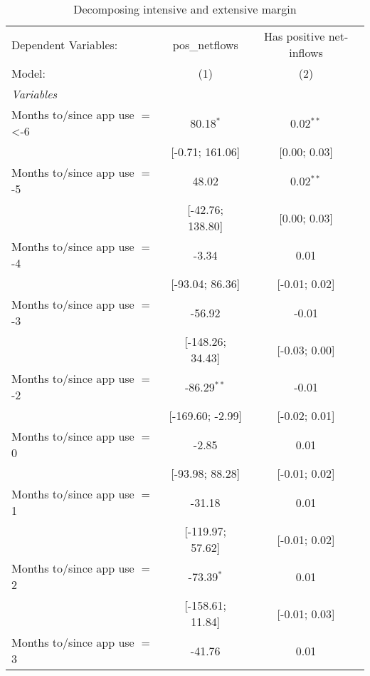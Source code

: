 
\begin{table}[htbp]
   \centering
   \tiny
   \begin{threeparttable}[b]
      \caption{\label{tab:reg_decomp_intext} Decomposing intensive and extensive margin}
      \begin{tabular}{lcc}
         \tabularnewline \midrule \midrule
         Dependent Variables:            & pos\_netflows    & Has positive net-inflows\\  
         Model:                          & (1)              & (2)\\  
         \midrule
         \emph{Variables}\\
         Months to/since app use $=$ <-6 & 80.18$^{*}$      & 0.02$^{**}$\\   
                                         & [-0.71; 161.06]  & [0.00; 0.03]\\   
         Months to/since app use $=$ -5  & 48.02            & 0.02$^{**}$\\   
                                         & [-42.76; 138.80] & [0.00; 0.03]\\   
         Months to/since app use $=$ -4  & -3.34            & 0.01\\   
                                         & [-93.04; 86.36]  & [-0.01; 0.02]\\   
         Months to/since app use $=$ -3  & -56.92           & -0.01\\   
                                         & [-148.26; 34.43] & [-0.03; 0.00]\\   
         Months to/since app use $=$ -2  & -86.29$^{**}$    & -0.01\\   
                                         & [-169.60; -2.99] & [-0.02; 0.01]\\   
         Months to/since app use $=$ 0   & -2.85            & 0.01\\   
                                         & [-93.98; 88.28]  & [-0.01; 0.02]\\   
         Months to/since app use $=$ 1   & -31.18           & 0.01\\   
                                         & [-119.97; 57.62] & [-0.01; 0.02]\\   
         Months to/since app use $=$ 2   & -73.39$^{*}$     & 0.01\\   
                                         & [-158.61; 11.84] & [-0.01; 0.03]\\   
         Months to/since app use $=$ 3   & -41.76           & 0.01\\   

\end{tabular}
\end{threeparttable}
\end{table}
